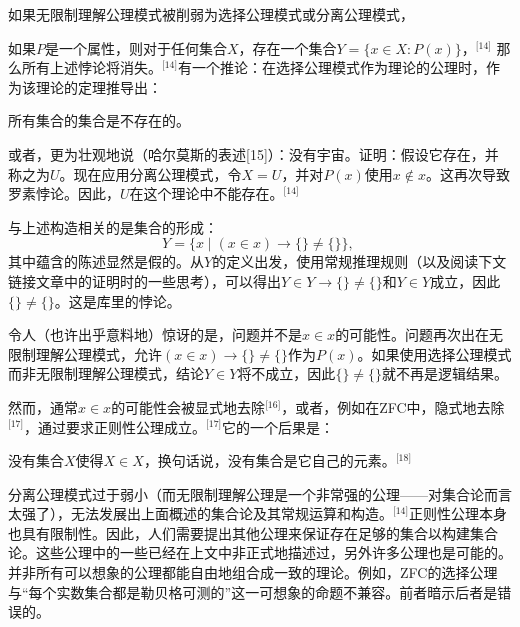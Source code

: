 如果无限制理解公理模式被削弱为选择公理模式或分离公理模式，

如果$P$是一个属性，则对于任何集合$X$，存在一个集合$Y = \{x \in X : P(x)\}$，\(^\text{[14]}\) 那么所有上述悖论将消失。\(^\text{[14]}\)有一个推论：在选择公理模式作为理论的公理时，作为该理论的定理推导出：

所有集合的集合是不存在的。

或者，更为壮观地说（哈尔莫斯的表述[15]）：没有宇宙。证明：假设它存在，并称之为$U$。现在应用分离公理模式，令$X = U$，并对$P(x)$使用$x \notin x$。这再次导致罗素悖论。因此，$U$在这个理论中不能存在。\(^\text{[14]}\)

与上述构造相关的是集合的形成：
$$Y = \{x \mid (x \in x) \rightarrow \{\} \neq \{\}\},~$$  
其中蕴含的陈述显然是假的。从$Y$的定义出发，使用常规推理规则（以及阅读下文链接文章中的证明时的一些思考），可以得出$Y \in Y \rightarrow \{\} \neq \{\}$和$Y \in Y$成立，因此$\{\} \neq \{\}$。这是库里的悖论。

令人（也许出乎意料地）惊讶的是，问题并不是$x \in x$的可能性。问题再次出在无限制理解公理模式，允许$(x \in x) \rightarrow \{\} \neq \{\}$作为$P(x)$。如果使用选择公理模式而非无限制理解公理模式，结论$Y \in Y$将不成立，因此$\{\} \neq \{\}$就不再是逻辑结果。

然而，通常$x \in x$的可能性会被显式地去除\(^\text{[16]}\)，或者，例如在ZFC中，隐式地去除\(^\text{[17]}\)，通过要求正则性公理成立。\(^\text{[17]}\)它的一个后果是：

没有集合$X$使得$X \in X$，换句话说，没有集合是它自己的元素。\(^\text{[18]}\)

分离公理模式过于弱小（而无限制理解公理是一个非常强的公理——对集合论而言太强了），无法发展出上面概述的集合论及其常规运算和构造。\(^\text{[14]}\)正则性公理本身也具有限制性。因此，人们需要提出其他公理来保证存在足够的集合以构建集合论。这些公理中的一些已经在上文中非正式地描述过，另外许多公理也是可能的。并非所有可以想象的公理都能自由地组合成一致的理论。例如，ZFC的选择公理与“每个实数集合都是勒贝格可测的”这一可想象的命题不兼容。前者暗示后者是错误的。